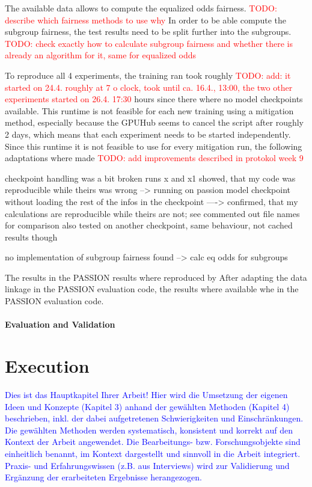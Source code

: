 \documentclass[12pt, a4paper, oneside]{book}   	%
\renewcommand{\todo}[1]{\textcolor{red}{TODO: #1}}
\renewcommand{\paragraph}[1]{%
	\subsubsection*{#1}%
}
\newcommand{\baaCriteria}[1]{\textcolor{blue}{#1}}
\begin{document}
			The available data allows to compute the equalized odds fairness. \todo{describe which fairness methods to use why}
			In order to be able compute the subgroup fairness, the test results need to be split further into the subgroups. \todo{check exactly how to calculate subgroup fairness and whether there is already an algorithm for it, same for equalized odds}
			
					
			To reproduce all 4 experiments, the training ran took roughly \todo{add: it started on 24.4. roughly at 7 o clock, took until ca. 16.4., 13:00, the two other experiments started on 26.4. 17:30} hours since there where no model checkpoints available. This runtime is not feasible for each new training using a mitigation method, especially because the GPUHub seems to cancel the script after roughly 2 days, which means that each experiment needs to be started independently.
			Since this runtime it is not feasible to use for every mitigation run, the following adaptations where made \todo{add improvements described in protokol week 9}
			
			
			checkpoint handling was a bit broken
			runs x and x1 showed, that my code was reproducible while theirs was wrong
			--> running on passion model checkpoint without loading the rest of the infos in the checkpoint
			----> confirmed, that my calculations are reproducible while theirs are not; see commented out file names for comparison
			also tested on another checkpoint, same behaviour, not cached results though
			
			
			no implementation of subgroup fairness found --> calc eq odds for subgroups
			
			
			The results in the PASSION results where reproduced by 
			After adapting the data linkage in the PASSION evaluation code, the results where available whe in the PASSION evaluation code. 
		\paragraph{Evaluation and Validation}
			
		
	\chapter{Execution}
		\baaCriteria{Dies ist das Hauptkapitel Ihrer Arbeit! Hier wird die Umsetzung der eigenen Ideen und Konzepte (Kapitel 3) anhand der gewählten Methoden (Kapitel 4) beschrieben, inkl. der dabei aufgetretenen Schwierigkeiten und Einschränkungen.}
		\baaCriteria{Die gewählten Methoden werden systematisch, konsistent und korrekt auf den Kontext der Arbeit angewendet. Die Bearbeitungs- bzw. Forschungsobjekte sind einheitlich benannt, im Kontext dargestellt und sinnvoll in die Arbeit integriert. Praxis- und Erfahrungswissen (z.B. aus Interviews) wird zur Validierung und Ergänzung der erarbeiteten Ergebnisse herangezogen. }
\end{document}
